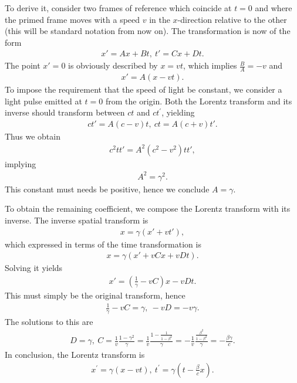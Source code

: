 To derive it, consider two frames of reference which coincide at $t = 0$ and where the primed frame moves with a speed $v$ in the $x$-direction relative to the other (this will be standard notation from now on). The transformation is now of the form
\begin{align*}
	x' = Ax + Bt, \ t' = Cx + Dt.
\end{align*}
The point $x' = 0$ is obviously described by $x = vt$, which implies $\frac{B}{A} = -v$ and
\begin{align*}
	x' = A(x - vt).
\end{align*}
To impose the requirement that the speed of light be constant, we consider a light pulse emitted at $t = 0$ from the origin. Both the Lorentz transform and its inverse should transform between $ct$ and $ct^{\prime}$, yielding
\begin{align*}
	ct' = A(c - v)t, \ ct = A(c + v)t'.
\end{align*}
Thus we obtain
\begin{align*}
	c^{2}tt' = A^{2}(c^{2} - v^{2})tt',
\end{align*}
implying
\begin{align*}
	A^{2} = \gamma^{2}.
\end{align*}
This constant must needs be positive, hence we conclude $A = \gamma$.

To obtain the remaining coefficient, we compose the Lorentz transform with its inverse. The inverse spatial transform is
\begin{align*}
	x = \gamma(x' + vt'),
\end{align*}
which expressed in terms of the time transformation is
\begin{align*}
	x = \gamma(x' + vCx + vDt).
\end{align*}
Solving it yields
\begin{align*}
	x' = \left(\frac{1}{\gamma} - vC\right)x - vDt.
\end{align*}
This must simply be the original transform, hence
\begin{align*}
	\frac{1}{\gamma} - vC = \gamma, \ -vD = -v\gamma.
\end{align*}
The solutions to this are
\begin{align*}
	D = \gamma, \ C = \frac{1}{v}\frac{1 - \gamma^{2}}{\gamma} = \frac{1}{v}\frac{1 - \frac{1}{1 - \beta^{2}}}{\gamma} = -\frac{1}{v}\frac{\frac{\beta^{2}}{1 - \beta^{2}}}{\gamma} = -\frac{\beta\gamma}{c}.
\end{align*}
In conclusion, the Lorentz transform is
\begin{align*}
	x^{\prime} = \gamma(x - vt),\ t^{\prime} = \gamma\left(t - \frac{\beta}{c}x\right).
\end{align*}

